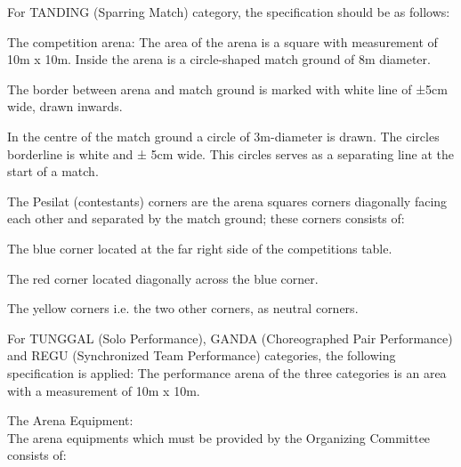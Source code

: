 \begin{legal}
    \begin{legal}
    \item For TANDING (Sparring Match) category, the specification should be as follows:
        \begin{legal}
        \item The competition arena: The area of the arena is a square with measurement of 10m x 10m. Inside the arena is a circle-shaped match ground of 8m diameter.
        \item The border between arena and match ground is marked with white line of ±5cm wide, drawn inwards.
        \item In the centre of the match ground a circle of 3m-diameter is drawn. The circles borderline is white and ± 5cm wide. This circles serves as a separating line at the start of a match.
        \item The Pesilat (contestants) corners are the arena squares corners diagonally facing each other and separated by the match ground; these corners consists of:
            \begin{legal}
            \item The blue corner located at the far right side of the competitions table.
            \item The red corner located diagonally across the blue corner.
            \item The yellow corners i.e. the two other corners, as neutral corners.
            \end{legal}
        \end{legal}
    \item For TUNGGAL (Solo Performance), GANDA (Choreographed Pair Performance) and REGU (Synchronized Team Performance) categories, the following specification is applied: The performance arena of the three categories is an area with a measurement of 10m x 10m.
    \end{legal}
\item The Arena Equipment: \\

The arena equipments which must be provided by the Organizing Committee consists of:


\end{legal}
